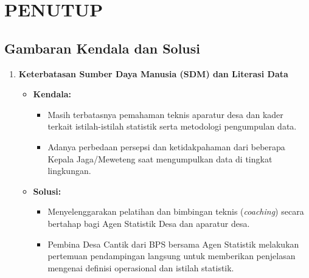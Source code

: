 
\chapter{PENUTUP}

\section{Gambaran Kendala dan Solusi}

\begin{enumerate}[label=\textbf{\arabic*.}]
  \item \textbf{Keterbatasan Sumber Daya Manusia (SDM) dan Literasi Data}
  \begin{itemize}
    \item \textbf{Kendala:}
    \begin{itemize}
      \item Masih terbatasnya pemahaman teknis aparatur desa dan kader terkait istilah-istilah statistik serta metodologi pengumpulan data.
      \item Adanya perbedaan persepsi dan ketidakpahaman dari beberapa Kepala Jaga/Meweteng saat mengumpulkan data di tingkat lingkungan.
    \end{itemize}
    \item \textbf{Solusi:}
    \begin{itemize}
      \item Menyelenggarakan pelatihan dan bimbingan teknis (\textit{coaching}) secara bertahap bagi Agen Statistik Desa dan aparatur desa.
      \item Pembina Desa Cantik dari BPS bersama Agen Statistik melakukan pertemuan pendampingan langsung untuk memberikan penjelasan mengenai definisi operasional dan istilah statistik.
    \end{itemize}
  \end{itemize}


\end{enumerate}
